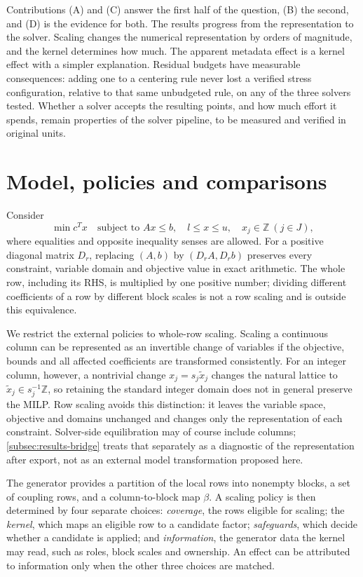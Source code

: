 \documentclass[smallextended,envcountsect,envcountsame]{svjour3}
\begin{document}
Contributions (A) and (C) answer the first half of the question, (B) the second, and (D) is the
evidence for both. The results progress from the representation to the solver. Scaling changes the numerical
representation by orders of magnitude, and the kernel determines how much. The apparent
metadata effect is a kernel effect with a simpler explanation. Residual budgets have
measurable consequences: adding one to a centering rule never lost a verified stress
configuration, relative to that same unbudgeted rule, on any of the three solvers tested. Whether a solver accepts the resulting points, and how much
effort it spends, remain properties of the solver pipeline, to be measured and verified in
original units.



\section{Model, policies and comparisons}
\label{sec:model}
Consider
\[
 \min c^Tx\quad\text{subject to }Ax\le b,\quad l\le x\le u,\quad x_j\in\mathbb Z\ (j\in J),
\]
where equalities and opposite inequality senses are allowed. For a positive diagonal matrix
$D_r$, replacing $(A,b)$ by $(D_rA,D_rb)$ preserves every constraint, variable domain and
objective value in exact arithmetic. The whole row, including its RHS, is multiplied by one
positive number; dividing different coefficients of a row by different block scales is not a
row scaling and is outside this equivalence.

We restrict the external policies to whole-row scaling. Scaling a continuous column can be
represented as an invertible change of variables if the objective, bounds and all affected
coefficients are transformed consistently. For an integer column, however, a nontrivial change
$x_j=s_j\widetilde x_j$ changes the natural lattice to $\widetilde x_j\in s_j^{-1}\mathbb Z$, so
retaining the standard integer domain does not in general preserve the MILP. Row scaling avoids
this distinction: it leaves the variable space, objective and domains unchanged and changes only
the representation of each constraint. Solver-side equilibration may of course include columns;
\cref{subsec:results-bridge} treats that separately as a diagnostic of the representation after
export, not as an external model transformation proposed here.

The generator provides a partition of the local rows into nonempty blocks, a set of coupling
rows, and a column-to-block map $\beta$. A scaling policy is then determined by four separate
choices: \emph{coverage}, the rows eligible for scaling; the \emph{kernel}, which maps an
eligible row to a candidate factor; \emph{safeguards}, which decide whether a candidate is
applied; and \emph{information}, the generator data the kernel may read, such as roles, block
scales and ownership. An effect can be attributed to information only when the other three
choices are matched.
\end{document}
